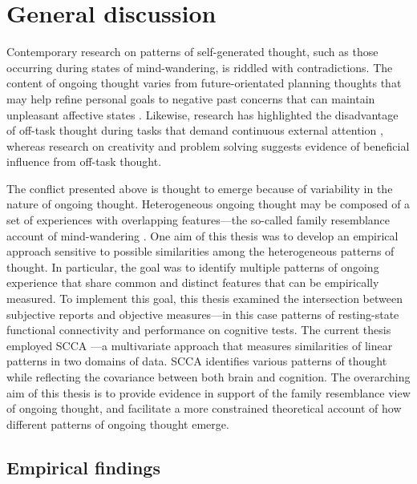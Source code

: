 \chapter{General discussion}
\label{ch:discussion}
Contemporary research on patterns of self-generated thought, such as those occurring during states of mind-wandering, is riddled with contradictions. The content of ongoing thought varies from future-orientated planning thoughts that may help refine personal goals \cite{Medea2016} to negative past concerns that can maintain unpleasant affective states \cite{Killingsworth2010}. Likewise, research has highlighted the disadvantage of off-task thought during tasks that demand continuous external attention \cite{McVayJOEP2009,McVay2012}, whereas research on creativity and problem solving suggests evidence of beneficial influence from off-task thought\cite{Smeekens2016,Baird2012}.

The conflict presented above is thought to emerge because of variability in the nature of ongoing thought. Heterogeneous ongoing thought may be composed of a set of experiences with overlapping features---the so-called family resemblance account of mind-wandering \cite{Smallwood2013, Seli2018}. One aim of this thesis was to develop an empirical approach sensitive to possible similarities among the heterogeneous patterns of thought.
In particular, the goal was to identify multiple patterns of ongoing experience that share common and distinct features that can be empirically measured. To implement this goal, this thesis examined the intersection between subjective reports and objective measures---in this case patterns of resting-state functional connectivity and performance on cognitive tests. The current thesis employed SCCA \cite{WittenSCCA2009}---a multivariate approach that measures similarities of linear patterns in two domains of data. SCCA identifies various patterns of thought while reflecting the covariance between both brain and cognition.
The overarching aim of this thesis is to provide evidence in support of the family resemblance view of ongoing thought, and facilitate a more constrained theoretical account of how different patterns of ongoing thought emerge.

\section{Empirical findings}
\label{ch:discussion:results}

